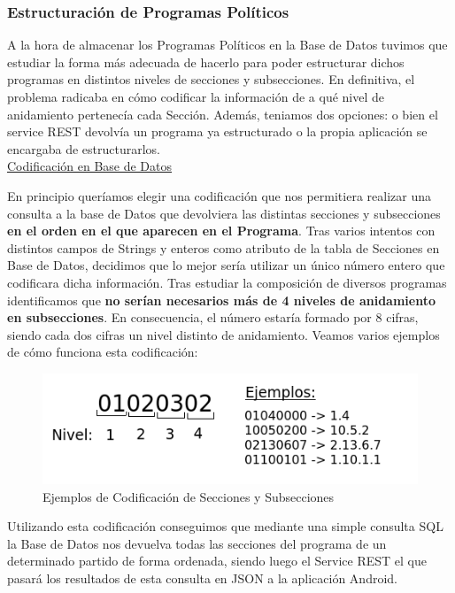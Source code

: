 	\subsubsection{Estructuración de Programas Políticos}

		A la hora de almacenar los Programas Políticos en la Base de Datos tuvimos que estudiar la forma más adecuada de hacerlo para poder estructurar dichos programas en distintos niveles de secciones y subsecciones. En definitiva, el problema radicaba en cómo codificar la información de a qué nivel de anidamiento pertenecía cada Sección. Además, teniamos dos opciones: o bien el service REST devolvía un programa ya estructurado o la propia aplicación se encargaba de estructurarlos. \\
		
		\underline{Codificación en Base de Datos}
		
		En principio queríamos elegir una codificación que nos permitiera realizar una consulta a la base de Datos que devolviera las distintas secciones y subsecciones \textbf{en el orden en el que aparecen en el Programa}. Tras varios intentos con distintos campos de Strings y enteros como atributo de la tabla de Secciones en Base de Datos, decidimos que lo mejor sería utilizar un único número entero que codificara dicha información. Tras estudiar la composición de diversos programas identificamos que \textbf{no serían necesarios más de 4 niveles de anidamiento en subsecciones}. En consecuencia, el número estaría formado por 8 cifras, siendo cada dos cifras un nivel distinto de anidamiento. Veamos varios ejemplos de cómo funciona esta codificación:
		
	\begin{figure}[H]
	  \centering
	    \includegraphics[keepaspectratio, scale=0.8]{Media/Captures/sectionsCodification.png}
	  \caption{Ejemplos de Codificación de Secciones y Subsecciones}
	  \label{fig:secCodification}
	\end{figure}	
	
	Utilizando esta codificación conseguimos que mediante una simple consulta SQL la Base de Datos nos devuelva todas las secciones del programa de un determinado partido de forma ordenada, siendo luego el Service REST el que pasará los resultados de esta consulta en JSON a la aplicación Android. \\ 
	
